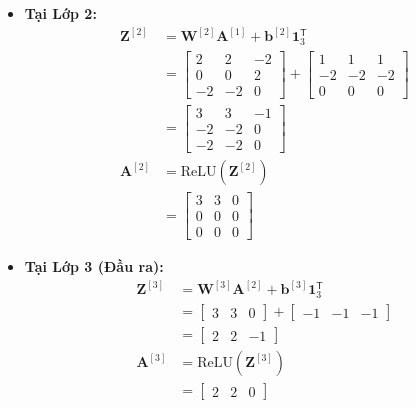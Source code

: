 \begin{itemize}
    \item \textbf{Tại Lớp 2:}
    \begin{align*}
    \mathbf{Z}^{[2]} &= \mathbf{W}^{[2]}\mathbf{A}^{[1]} + \mathbf{b}^{[2]}\mathbf{1}_3^{\mathsf{T}} \\
    &= \begin{bmatrix} 2 & 2 & -2 \\ 0 & 0 & 2 \\ -2 & -2 & 0 \end{bmatrix} + \begin{bmatrix} 1 & 1 & 1 \\ -2 & -2 & -2 \\ 0 & 0 & 0 \end{bmatrix} \\
    &= \begin{bmatrix} 3 & 3 & -1 \\ -2 & -2 & 0 \\ -2 & -2 & 0 \end{bmatrix} \\
    \mathbf{A}^{[2]} &= \text{ReLU}\!\left(\mathbf{Z}^{[2]}\right) \\
    &= \begin{bmatrix} 3 & 3 & 0 \\ 0 & 0 & 0 \\ 0 & 0 & 0 \end{bmatrix}
    \end{align*}

    \item \textbf{Tại Lớp 3 (Đầu ra):}
    \begin{align*}
    \mathbf{Z}^{[3]} &= \mathbf{W}^{[3]}\mathbf{A}^{[2]} + \mathbf{b}^{[3]}\mathbf{1}_3^{\mathsf{T}} \\
    &= \begin{bmatrix} 3 & 3 & 0 \end{bmatrix} + \begin{bmatrix} -1 & -1 & -1 \end{bmatrix} \\
    &= \begin{bmatrix} 2 & 2 & -1 \end{bmatrix} \\
    \mathbf{A}^{[3]} &= \text{ReLU}\!\left(\mathbf{Z}^{[3]}\right) \\
    &= \begin{bmatrix} 2 & 2 & 0 \end{bmatrix}
    \end{align*}
\end{itemize}

